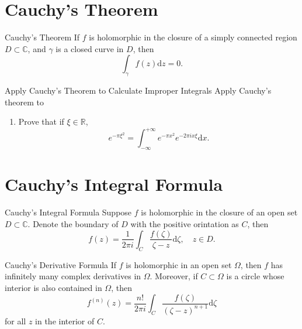 
\section{Cauchy's Theorem}

\begin{theorem}{Cauchy's Theorem}{}
  If $f$ is holomorphic in the closure of a simply connected region $D \subset \mathbb{C}$,
  and $\gamma$ is a closed curve in $D$, then
  \begin{equation}
    \int_{\gamma} f(z)\mathrm{d} z = 0.
  \end{equation}
\end{theorem}

\begin{example}{Apply Cauchy's Theorem to Calculate Improper Integrals}{}
  Apply Cauchy's theorem to 
  \begin{enumerate}
  \item Prove that if $\xi \in \mathbb{R}$,
    \begin{equation}
      e^{- \pi \xi^2} = \int_{-\infty}^{+\infty} e^{-\pi x^2} e^{-2\pi i x \xi} \mathrm{d} x.
    \end{equation}
  \end{enumerate}
\end{example}

\section{Cauchy's Integral Formula}

\begin{theorem}{Cauchy's Integral Formula}{}
  Suppose $f$ is holomorphic in the closure of an open set $D \subset \mathbb{C}$.
  Denote the boundary of $D$ with the positive orintation as $C$, then
  \begin{equation}
    f(z) = \frac{1}{2 \pi i} \int_C \frac{f(\zeta)}{\zeta - z}\mathrm{d} \zeta, \quad
    z \in D.
  \end{equation}
\end{theorem}

\begin{corollary}{Cauchy's Derivative Formula}{}
  If $f$ is holomorphic in an open set $\Omega$,
  then $f$ has infinitely many complex derivatives in $\Omega$.
  Moreover, if $C \subset \Omega$ is a circle whose interior is also contained in $\Omega$,
  then
  \begin{equation}
    f^{(n)}(z) = \frac{n!}{2 \pi i} \int_C \frac{f(\zeta)}{(\zeta - z)^{n+1}}\mathrm{d} \zeta
  \end{equation}
  for all $z$ in the interior of $C$.
\end{corollary}

